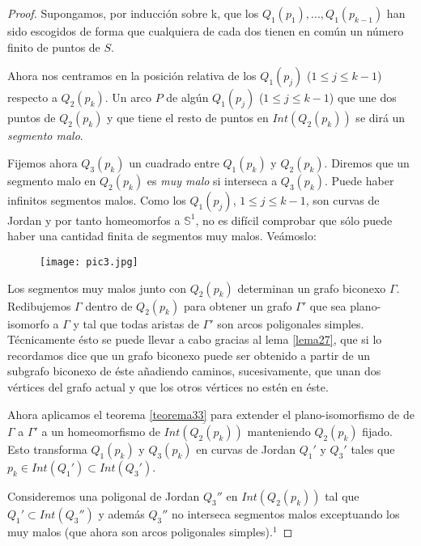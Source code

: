 \documentclass[12pt,a4paper,oldfontcommands]{memoir}
\begin{document}
\begin{proof}
	Supongamos, por inducción sobre k, que los $Q_{1}(p_{1}),...,Q_{1}(p_{k-1})$ han sido escogidos de forma que cualquiera de cada dos tienen en común un número finito de puntos de $S$. 

	Ahora nos centramos en la posición relativa de los $Q_{1}(p_j)$ ($1 \leq j \leq k-1$) respecto a $Q_{2}(p_k)$. Un arco $P$ de algún $Q_{1}(p_j)$ ($1 \leq j \leq k-1$) que une dos puntos de $Q_{2}(p_k)$ y que tiene el resto de puntos en $Int(Q_{2}(p_k))$ se dirá un 
 {\em segmento malo}. 
 
Fijemos ahora $Q_{3}(p_k)$ un cuadrado entre $Q_{1}(p_k)$ y $Q_{2}(p_k)$. Diremos que  un segmento malo en $Q_{2}(p_k)$ es {\em muy malo} si interseca a $Q_{3}(p_k)$. Puede haber infinitos segmentos malos. Como los $Q_{1}(p_{j})$, $1\leq j\leq k-1$, son curvas de Jordan y por tanto homeomorfos a $\mathbb{S}^1$, no es difícil comprobar que sólo puede haber una cantidad finita de segmentos muy malos. Veámoslo:

\begin{figure}[h]
\centering
\begin{minipage}[c]{\textwidth}
\centering
    \texttt{[image: pic3.jpg]}
\end{minipage}
\end{figure}

	Los segmentos muy malos junto con $Q_{2}(p_k)$ determinan un grafo biconexo $\Gamma$. Redibujemos $\Gamma$ dentro de $Q_{2}(p_k)$  para obtener un grafo $\Gamma'$ que sea plano-isomorfo a $\Gamma$ y tal que todas aristas de $\Gamma'$ son arcos poligonales simples. Técnicamente ésto se puede llevar a cabo gracias al lema \ref{lema27}, que si lo recordamos dice que un grafo biconexo puede ser obtenido a partir de un subgrafo biconexo de éste añadiendo caminos, sucesivamente, que unan dos vértices del grafo actual y que los otros vértices no estén en éste.

	Ahora aplicamos el teorema \ref{teorema33} para extender el plano-isomorfismo de de $\Gamma$ a $\Gamma'$ a un homeomorfismo de $\overline{Int(Q_{2}(p_k))}$ manteniendo $Q_{2}(p_k)$ fijado. Esto transforma $Q_{1}(p_k)$ y $Q_{3}(p_k)$ en curvas de Jordan $Q_{1}'$ y $Q_{3}'$ tales que $p_{k} \in Int(Q_{1}') \subset Int(Q_{3}')$.

	Consideremos una poligonal de Jordan $Q_{3}''$ en $Int(Q_{2}(p_k))$ tal que $Q_{1}' \subset Int(Q_{3}'')$ y además $Q_{3}''$ no interseca segmentos malos exceptuando los muy malos (que ahora son arcos poligonales simples).$^{1}$
	

\end{proof}
\end{document}
